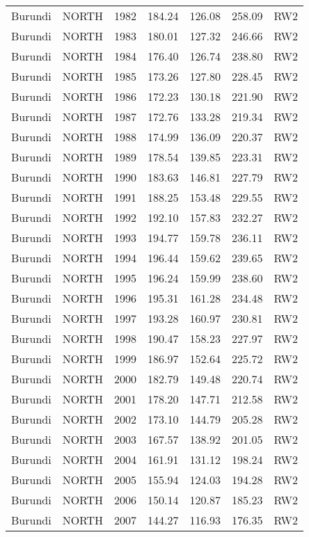 \begin{longtable}{lllrrrl}
  Burundi & NORTH & 1982 & 184.24 & 126.08 & 258.09 & RW2 \\ 
  Burundi & NORTH & 1983 & 180.01 & 127.32 & 246.66 & RW2 \\ 
  Burundi & NORTH & 1984 & 176.40 & 126.74 & 238.80 & RW2 \\ 
  Burundi & NORTH & 1985 & 173.26 & 127.80 & 228.45 & RW2 \\ 
  Burundi & NORTH & 1986 & 172.23 & 130.18 & 221.90 & RW2 \\ 
  Burundi & NORTH & 1987 & 172.76 & 133.28 & 219.34 & RW2 \\ 
  Burundi & NORTH & 1988 & 174.99 & 136.09 & 220.37 & RW2 \\ 
  Burundi & NORTH & 1989 & 178.54 & 139.85 & 223.31 & RW2 \\ 
  Burundi & NORTH & 1990 & 183.63 & 146.81 & 227.79 & RW2 \\ 
  Burundi & NORTH & 1991 & 188.25 & 153.48 & 229.55 & RW2 \\ 
  Burundi & NORTH & 1992 & 192.10 & 157.83 & 232.27 & RW2 \\ 
  Burundi & NORTH & 1993 & 194.77 & 159.78 & 236.11 & RW2 \\ 
  Burundi & NORTH & 1994 & 196.44 & 159.62 & 239.65 & RW2 \\ 
  Burundi & NORTH & 1995 & 196.24 & 159.99 & 238.60 & RW2 \\ 
  Burundi & NORTH & 1996 & 195.31 & 161.28 & 234.48 & RW2 \\ 
  Burundi & NORTH & 1997 & 193.28 & 160.97 & 230.81 & RW2 \\ 
  Burundi & NORTH & 1998 & 190.47 & 158.23 & 227.97 & RW2 \\ 
  Burundi & NORTH & 1999 & 186.97 & 152.64 & 225.72 & RW2 \\ 
  Burundi & NORTH & 2000 & 182.79 & 149.48 & 220.74 & RW2 \\ 
  Burundi & NORTH & 2001 & 178.20 & 147.71 & 212.58 & RW2 \\ 
  Burundi & NORTH & 2002 & 173.10 & 144.79 & 205.28 & RW2 \\ 
  Burundi & NORTH & 2003 & 167.57 & 138.92 & 201.05 & RW2 \\ 
  Burundi & NORTH & 2004 & 161.91 & 131.12 & 198.24 & RW2 \\ 
  Burundi & NORTH & 2005 & 155.94 & 124.03 & 194.28 & RW2 \\ 
  Burundi & NORTH & 2006 & 150.14 & 120.87 & 185.23 & RW2 \\ 
  Burundi & NORTH & 2007 & 144.27 & 116.93 & 176.35 & RW2 \\ 

\end{longtable}
